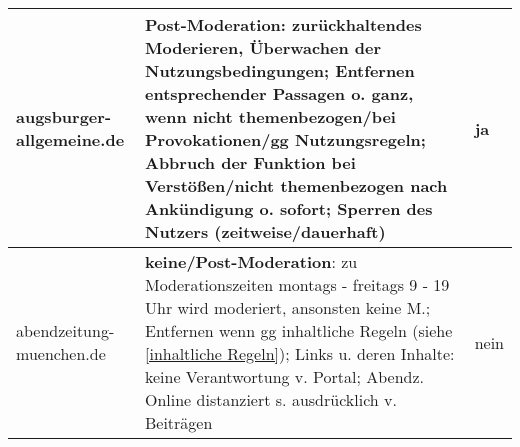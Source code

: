 \begin{longtable}{p{24mm}p{98mm}p{11mm}}
augsburger-allgemeine.de

& {\bfseries Post-Moderation}: zurückhaltendes Moderieren, Überwachen der
  Nutzungsbedingungen; Entfernen entsprechender Passagen o. ganz, wenn nicht
  themenbezogen/bei Provokationen/gg Nutzungsregeln; Abbruch der
  Funktion bei Verstößen/nicht themenbezogen nach Ankündigung o. sofort;
  Sperren  des Nutzers (zeitweise/dauerhaft)
  & \centerline{ja}
\\*\midrule

abendzeitung-muenchen.de

& {\bfseries keine/Post-Moderation}: zu Moderationszeiten montags - freitags 9 - 19 Uhr
wird moderiert, ansonsten keine M.; Entfernen wenn gg inhaltliche Regeln (siehe \ref{inhaltliche Regeln}); 
Links u.  deren Inhalte: keine Verantwortung v. Portal; Abendz. Online distanziert s.
ausdrücklich v. Beiträgen
  & \centerline{nein}


\end{longtable}

\endgroup

